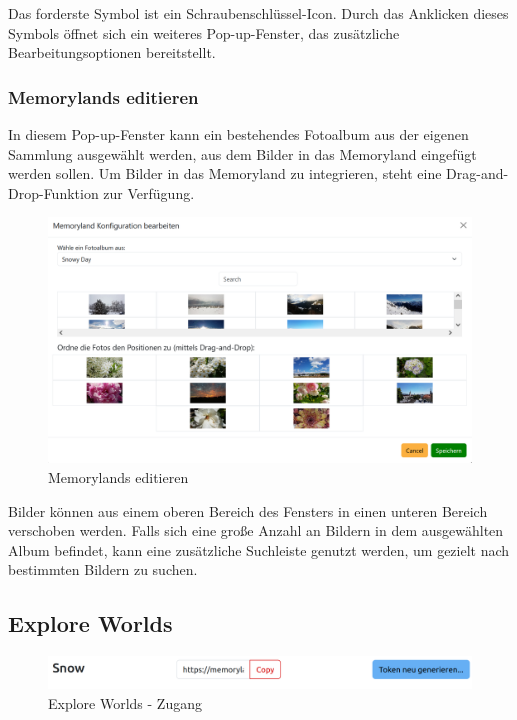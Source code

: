 Das forderste Symbol ist ein Schraubenschlüssel-Icon. Durch das Anklicken dieses Symbols öffnet sich ein weiteres Pop-up-Fenster, das zusätzliche Bearbeitungsoptionen bereitstellt. 

\subsubsection{Memorylands editieren}

In diesem Pop-up-Fenster kann ein bestehendes Fotoalbum aus der eigenen Sammlung ausgewählt werden, aus dem Bilder in das Memoryland eingefügt werden sollen. Um Bilder in das Memoryland zu integrieren, steht eine Drag-and-Drop-Funktion zur Verfügung. 

\begin{figure} [h t]
    \centering
    \includegraphics[scale=0.6]{pics/all_worlds_teil2_button.PNG}
    \caption{Memorylands editieren}
    \label{fig:all-worlds-memorylands-editieren}
\end{figure}

Bilder können aus einem oberen Bereich des Fensters in einen unteren Bereich verschoben werden. Falls sich eine gro\ss{}e Anzahl an Bildern in dem ausgewählten Album befindet, kann eine zusätzliche Suchleiste genutzt werden, um gezielt nach bestimmten Bildern zu suchen.

\clearpage

\subsection{Explore Worlds}
\label{subsec:frontend-explore-worlds}

\begin{figure} [h t]
    \centering
    \includegraphics[scale=0.2]{pics/explore_worlds_header.png}
    \caption{Explore Worlds - Zugang}
    \label{fig:explore-worlds-overview}
\end{figure}

